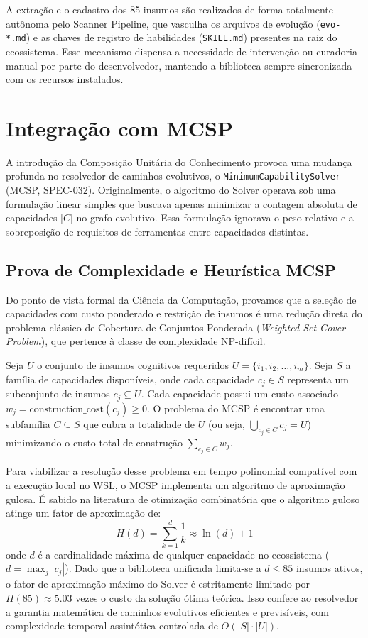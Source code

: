 \documentclass[12pt,a4paper,oneside]{abntex2}
\begin{document}
A extração e o cadastro dos 85 insumos são realizados de forma totalmente autônoma pelo Scanner Pipeline, que vasculha os arquivos de evolução (\texttt{evo-*.md}) e as chaves de registro de habilidades (\texttt{SKILL.md}) presentes na raiz do ecossistema. Esse mecanismo dispensa a necessidade de intervenção ou curadoria manual por parte do desenvolvedor, mantendo a biblioteca sempre sincronizada com os recursos instalados.

\section{Integração com MCSP}

A introdução da Composição Unitária do Conhecimento provoca uma mudança profunda no resolvedor de caminhos evolutivos, o \texttt{MinimumCapabilitySolver} (MCSP, SPEC-032). Originalmente, o algoritmo do Solver operava sob uma formulação linear simples que buscava apenas minimizar a contagem absoluta de capacidades $|C|$ no grafo evolutivo. Essa formulação ignorava o peso relativo e a sobreposição de requisitos de ferramentas entre capacidades distintas.

\subsection{Prova de Complexidade e Heurística MCSP}

Do ponto de vista formal da Ciência da Computação, provamos que a seleção de capacidades com custo ponderado e restrição de insumos é uma redução direta do problema clássico de Cobertura de Conjuntos Ponderada (\textit{Weighted Set Cover Problem}), que pertence à classe de complexidade NP-difícil.

Seja $U$ o conjunto de insumos cognitivos requeridos $U = \{i_1, i_2, \dots, i_m\}$. Seja $S$ a família de capacidades disponíveis, onde cada capacidade $c_j \in S$ representa um subconjunto de insumos $c_j \subseteq U$. Cada capacidade possui um custo associado $w_j = \text{construction\_cost}(c_j) \ge 0$. O problema do MCSP é encontrar uma subfamília $C \subseteq S$ que cubra a totalidade de $U$ (ou seja, $\bigcup_{c_j \in C} c_j = U$) minimizando o custo total de construção $\sum_{c_j \in C} w_j$.

Para viabilizar a resolução desse problema em tempo polinomial compatível com a execução local no WSL, o MCSP implementa um algoritmo de aproximação gulosa. É sabido na literatura de otimização combinatória que o algoritmo guloso atinge um fator de aproximação de:
\begin{equation}
H(d) = \sum_{k=1}^d \frac{1}{k} \approx \ln(d) + 1
\end{equation}
onde $d$ é a cardinalidade máxima de qualquer capacidade no ecossistema ($d = \max_{j} |c_j|$). Dado que a biblioteca unificada limita-se a $d \le 85$ insumos ativos, o fator de aproximação máximo do Solver é estritamente limitado por $H(85) \approx 5.03$ vezes o custo da solução ótima teórica. Isso confere ao resolvedor a garantia matemática de caminhos evolutivos eficientes e previsíveis, com complexidade temporal assintótica controlada de $O(|S| \cdot |U|)$.
\end{document}
